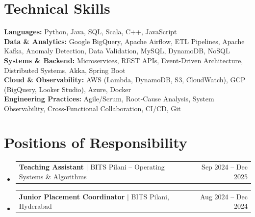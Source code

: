 \documentclass[letterpaper,10.5pt]{article}
\makeatletter
\newcommand{\resumeProjectHeading}[2]{
  \item
  \begin{tabular*}{0.97\textwidth}{l@{\extracolsep{\fill}}r}
    \small #1 & \small #2 \\
  \end{tabular*}\vspace{-7pt}
}
\newcommand{\resumeSubHeadingListStart}{\begin{itemize}[leftmargin=0.12in, label={}]}
\newcommand{\resumeSubHeadingListEnd}{\end{itemize}}
\makeatother
\begin{document}
\section{Technical Skills}
\begin{itemize}[leftmargin=0.12in, label={}]
\small{\item{
\textbf{Languages:} Python, Java, SQL, Scala, C++, JavaScript \\[0.5pt]
\textbf{Data \& Analytics:} Google BigQuery, Apache Airflow, ETL Pipelines, Apache Kafka, Anomaly Detection, Data Validation, MySQL, DynamoDB, NoSQL \\[0.5pt]
\textbf{Systems \& Backend:} Microservices, REST APIs, Event-Driven Architecture, Distributed Systems, Akka, Spring Boot \\[0.5pt]
\textbf{Cloud \& Observability:} AWS (Lambda, DynamoDB, S3, CloudWatch), GCP (BigQuery, Looker Studio), Azure, Docker \\[0.5pt]
\textbf{Engineering Practices:} Agile/Scrum, Root-Cause Analysis, System Observability, Cross-Functional Collaboration, CI/CD, Git
}}
\end{itemize}\vspace{-4pt}

\section{Positions of Responsibility}
\resumeSubHeadingListStart
  \resumeProjectHeading{\textbf{Teaching Assistant} $|$ \textnormal{BITS Pilani -- Operating Systems \& Algorithms}}{Sep 2024 -- Dec 2025}
  \resumeProjectHeading{\textbf{Junior Placement Coordinator} $|$ \textnormal{BITS Pilani, Hyderabad}}{Aug 2024 -- Dec 2024}
\resumeSubHeadingListEnd
\end{document}
